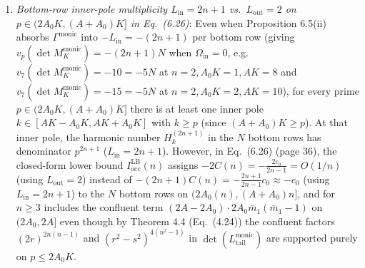 \documentclass[11pt,a4paper]{article}
\begin{document}
\begin{itemize}
\begin{enumerate}
    \item \emph{Bottom-row inner-pole multiplicity $L_{\mathrm{in}} = 2n+1$ vs.\ $L_{\mathrm{out}} = 2$ on $p \in (2A_0 K, (A+A_0)K]$ in Eq.\ (6.26)}:
    Even when Proposition 6.5(ii) absorbs $\Gamma^{\mathrm{monic}}$ into $-L_{\mathrm{in}} = -(2n+1)$ per bottom row (giving $v_p(\det M_K^{\mathrm{monic}}) = -(2n+1)N$ when $\Omega_{\mathrm{in}} = 0$, e.g.\ $v_7(\det M_K^{\mathrm{monic}}) = -10 = -5N$ at $n=2, A_0 K=1, AK=8$ and $v_7(\det M_K^{\mathrm{monic}}) = -15 = -5N$ at $n=2, A_0 K=2, AK=10$), for every prime $p \in (2A_0 K, (A+A_0)K]$ there is at least one inner pole $k \in [AK - A_0 K, AK + A_0 K]$ with $k \ge p$ (since $(A+A_0)K \ge p$). At that inner pole, the harmonic number $H_k^{(2n+1)}$ in the $N$ bottom rows has denominator $p^{2n+1}$ ($L_{\mathrm{in}} = 2n+1$). However, in Eq.\ (6.26) (page 36), the closed-form lower bound $I_{\mathrm{occ}}^{\mathrm{LB}}(n)$ assigns $-2C(n) = -\frac{2c_0}{2n-1} = O(1/n)$ (using $L_{\mathrm{out}} = 2$) instead of $-(2n+1)C(n) = -\frac{2n+1}{2n-1}c_0 \approx -c_0$ (using $L_{\mathrm{in}} = 2n+1$) to the $N$ bottom rows on $(2A_0(n), (A+A_0)n]$, and for $n \ge 3$ includes the confluent term $(2A - 2A_0)\cdot 2A_0\bar{m}_1(\bar{m}_1-1)$ on $(2A_0, 2A]$ even though by Theorem 4.4 (Eq.\ (4.24)) the confluent factors $(2r)^{2n(n-1)}$ and $(r^2-s^2)^{4(n^2-1)}$ in $\det(L_{\mathrm{tail}}^{\mathrm{monic}})$ are supported purely on $p \le 2A_0 K$.
  \end{enumerate}
\end{itemize}
\end{document}

